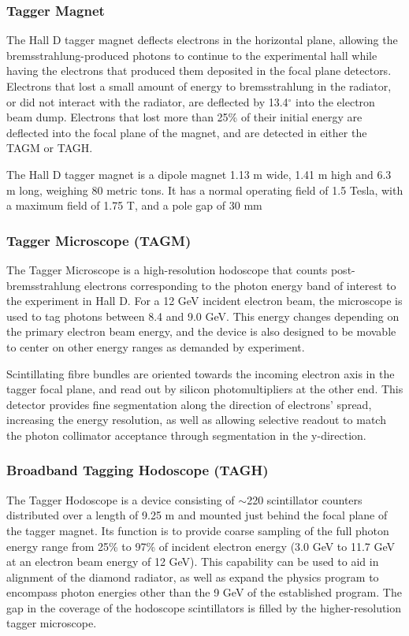 \subsubsection{Tagger Magnet \label{sec:tagMagnet}}
The Hall D tagger magnet deflects electrons in the horizontal plane, allowing the bremsstrahlung-produced photons to continue to the experimental hall while having the electrons that produced them deposited in the focal plane detectors.
Electrons that lost a small amount of energy to bremsstrahlung in the
radiator, or did not interact with the radiator, are deflected by 13.4$^\circ$ into the electron beam dump.
Electrons that lost more than 25\% of their initial energy are deflected into the focal plane of the magnet, and are detected in either the TAGM or TAGH.

The Hall D tagger magnet is a dipole magnet 1.13 m wide, 1.41 m high and 6.3 m long, weighing 80 metric tons.
It has a normal operating field of 1.5 Tesla, with a maximum field of 1.75 T, and a pole gap of 30 mm


\subsubsection{Tagger Microscope (TAGM)}\label{sec:TAGM}
The Tagger Microscope is a high-resolution hodoscope that counts post-bremsstrahlung electrons corresponding to the photon energy band of interest to the experiment in Hall D.
For a 12 GeV incident electron beam, the microscope is used to tag photons between 8.4 and 9.0 GeV.
This energy changes depending on the primary electron beam energy, and the device is also designed to be movable to center on other energy ranges as demanded by experiment.

Scintillating fibre bundles are oriented towards the incoming electron axis in the tagger focal plane, and read out by silicon photomultipliers at the other end.
This detector provides fine segmentation along the direction of electrons' spread, increasing the energy resolution, as well as allowing selective readout to match the photon collimator acceptance through segmentation in the y-direction.

\subsubsection{Broadband Tagging Hodoscope (TAGH)}\label{sec:TAGHIntro}
The Tagger Hodoscope is a device consisting of $\sim$220 scintillator counters distributed over a length of 9.25 m and mounted just behind the focal plane of the tagger magnet.
Its function is to provide coarse sampling of the full photon energy range from 25\% to 97\% of incident electron energy (3.0 GeV to 11.7 GeV at an electron beam energy of 12 GeV).
This capability can be used to aid in alignment of the diamond radiator, as well as expand the \GX{} physics program to encompass photon energies other than the 9 GeV of the established program.
The gap in the coverage of the hodoscope scintillators is filled by the higher-resolution tagger microscope.

